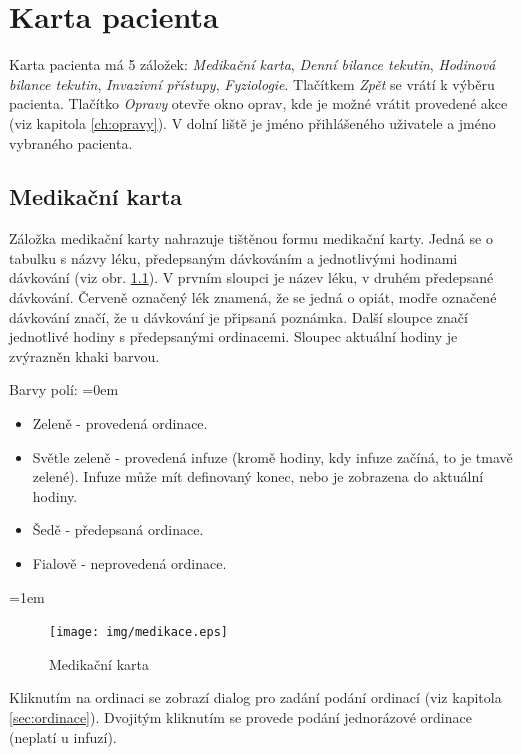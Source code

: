 
\chapter{Karta pacienta}

Karta pacienta má 5 záložek: \emph{Medikační karta}, \emph{Denní bilance tekutin}, \emph{Hodinová bilance tekutin}, \emph{Invazivní přístupy}, \emph{Fyziologie}. Tlačítkem \emph{Zpět} se vrátí k výběru pacienta. Tlačítko \emph{Opravy} otevře okno oprav, kde je možné vrátit provedené akce (viz kapitola \ref{ch:opravy}). V dolní liště je jméno přihlášeného uživatele a jméno vybraného pacienta.


\section{Medikační karta}

Záložka medikační karty nahrazuje tištěnou formu medikační karty. Jedná se o tabulku s názvy léku, předepsaným dávkováním a jednotlivými hodinami dávkování (viz obr. \ref{fig:medikace}). V prvním sloupci je název léku, v druhém předepsané dávkování. Červeně označený lék znamená, že se jedná o opiát, modře označené dávkování značí, že u dávkování je připsaná poznámka. Další sloupce značí jednotlivé hodiny s předepsanými ordinacemi. Sloupec aktuální hodiny je zvýrazněn khaki barvou. 

Barvy polí:
\parskip=0em
\begin{itemize}
	\item Zeleně - provedená ordinace.
	\item Světle zeleně - provedená infuze (kromě hodiny, kdy infuze začíná, to je tmavě zelené). Infuze může mít definovaný konec, nebo je zobrazena do aktuální hodiny.
	\item Šedě - předepsaná ordinace.
	\item Fialově - neprovedená ordinace.
\end{itemize}
\parskip=1em

\begin{figure}[H]
	\centering
	\texttt{[image: img/medikace.eps]}
	\caption{Medikační karta}
  \label{fig:medikace}
\end{figure}

Kliknutím na ordinaci se zobrazí dialog pro zadání podání ordinací (viz kapitola \ref{sec:ordinace}). Dvojitým kliknutím se provede podání jednorázové ordinace (neplatí u infuzí).

